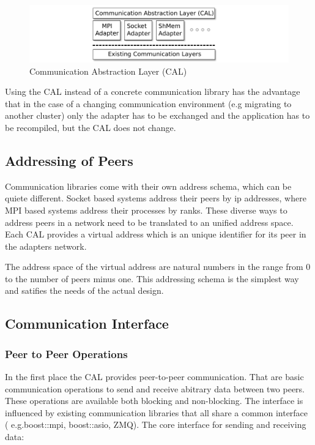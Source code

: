 \begin{figure}[H]
  \centering \includegraphics[width=\textwidth]{graphics/30_cal}
  \caption{Communication Abstraction Layer (CAL)}
  \label{fig:cal}
\end{figure}

Using the CAL instead of a concrete communication library has the
advantage that in the case of a changing communication environment
(e.g migrating to another cluster) only the adapter has to be
exchanged and the application has to be recompiled, but the CAL does
not change.

\subsection{Addressing of Peers}
Communication libraries come with their own address schema, which can
be quiete different. Socket based systems address their peers by ip
addresses, where MPI based systems address their processes by ranks.
These diverse ways to address peers in a network need to be translated
to an unified address space. Each CAL provides a virtual address
which is an unique identifier for its peer in the adapters network.

The address space of the virtual address are natural numbers in 
the range from 0 to the number of peers minus one. This addressing
schema is the simplest way and satifies the needs of the actual design.

\subsection{Communication Interface}

\subsubsection{Peer to Peer Operations}
In the first place the CAL provides peer-to-peer communication. That
are basic communication operations to send and receive abitrary data
between two peers. These operations are available both blocking and
non-blocking. The interface is influenced by existing communication
libraries that all share a common interface ( e.g.boost::mpi,
boost::asio, ZMQ). The core interface for sending and receiving data:

